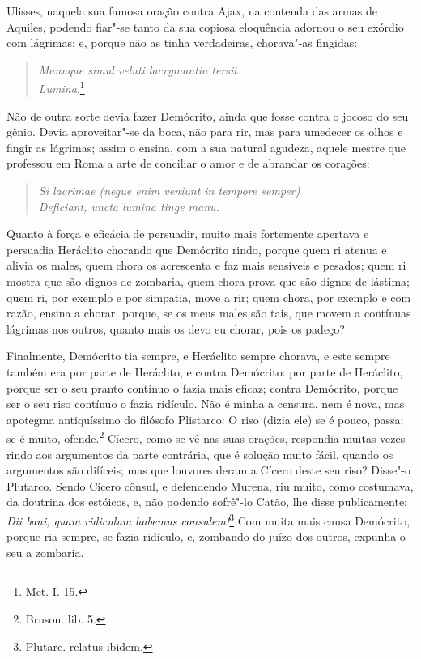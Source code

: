 Ulisses, naquela sua famosa oração contra Ajax, na contenda das armas de
Aquiles, podendo fiar"-se tanto da sua copiosa eloquência adornou o seu
exórdio com lágrimas; e, porque não as tinha verdadeiras, chorava"-as
fingidas:

\begin{verse}
\emph{Manuque simul veluti lacrymantia tersit}\\
\emph{Lumina}.\footnote{Met. I. 15.}
\end{verse}

Não de outra sorte devia fazer Demócrito, ainda que fosse contra o
jocoso do seu gênio. Devia aproveitar"-se da boca, não para rir, mas para
umedecer os olhos e fingir as lágrimas; assim o ensina, com a sua
natural agudeza, aquele mestre que professou em Roma a arte de conciliar
o amor e de abrandar os corações:

\begin{verse}
\emph{Si lacrimae (negue enim veniunt in tempore semper)}\\
\emph{Deficiant, uncta lumina tinge manu.}
\end{verse}

Quanto à força e eficácia de persuadir, muito mais fortemente apertava e
persuadia Heráclito chorando que Demócrito rindo, porque quem ri atenua
e alivia os males, quem chora os acrescenta e faz mais sensíveis e
pesados; quem ri mostra que são dignos de zombaria, quem chora prova que
são dignos de lástima; quem ri, por exemplo e por simpatia, move a rir;
quem chora, por exemplo e com razão, ensina a chorar, porque, se os meus
males são tais, que movem a contínuas lágrimas nos outros, quanto mais
os devo eu chorar, pois os padeço?

Finalmente, Demócrito tia sempre, e Heráclito sempre chorava, e este
sempre também era por parte de Heráclito, e contra Demócrito: por parte
de Heráclito, porque ser o seu pranto contínuo o fazia mais eficaz;
contra Demócrito, porque ser o seu riso contínuo o fazia ridículo. Não é
minha a censura, nem é nova, mas apotegma antiquíssimo do filósofo
Plistarco: O riso (dizia ele) se é pouco, passa; se é muito, ofende.\footnote{Bruson. lib. 5.}
Cícero, como se vê nas suas orações, respondia muitas vezes rindo aos
argumentos da parte contrária, que é solução muito fácil, quando os
argumentos são difíceis; mas que louvores deram a Cícero deste seu riso?
Disse"-o Plutarco. Sendo Cícero cônsul, e defendendo Murena, riu muito,
como costumava, da doutrina dos estóicos, e, não podendo sofrê"-lo Catão,
lhe disse publicamente: \emph{Dii bani, quam ridiculum habemus consulem!}\footnote{Plutarc. relatus ibidem.} Com muita mais causa Demócrito, porque ria
sempre, se fazia ridículo, e, zombando do juízo dos outros, expunha o
seu a zombaria.

